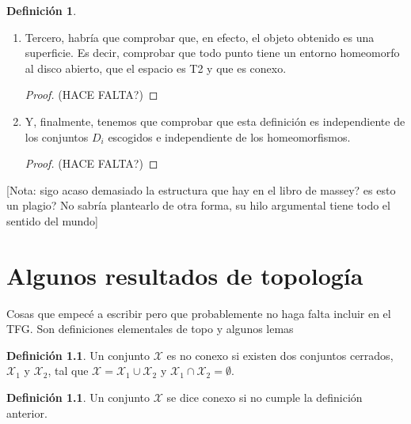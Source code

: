 \documentclass[a4paper,11pt,spanish, twoside, leqno]{tfg-uam}
\theoremstyle{definition}
\newtheorem{defin}[teor]{Definici\'on}
\begin{document}
\begin{defin}
\begin{enumerate}
\begin{proof}
			Partiendo de eso, basta con probar que dado un homeomorfismo $f: X\longrightarrow Y$, y el conjunto cerrado $B\subset X$, entonces $f(fr(B)))= fr(f(B))$.
			Para esto basta con probar que dado un homeomorfismo $f: U\subset X \longrightarrow V\subset Y$, con $U$ y $V$ cerrados, se cumple que $f(fr(U)) = fr(V)$. Esto se sigue directamente de que $f(\mathring{B})=\mathring{f(B)}$, que a su vez es resultado inmediato de las propiedades de homeomorfismos. (HACE FALTA?)
		\end{proof}
		\item 
		Tercero, habría que comprobar que, en efecto, el objeto obtenido es una superficie. Es decir, comprobar que todo punto tiene un entorno homeomorfo al disco abierto, que el espacio es T2 y que es conexo.
		\begin{proof}
			
			(HACE FALTA?)
		\end{proof}
		\item 
		Y, finalmente, tenemos que comprobar que esta definición es independiente de los conjuntos $D_i$ escogidos e independiente de los homeomorfismos.
		\begin{proof}
			(HACE FALTA?)
		\end{proof}
	\end{enumerate} 
\end{defin}

[Nota: sigo acaso demasiado la estructura que hay en el libro de massey? es esto un plagio? No sabría plantearlo de otra forma, su hilo argumental tiene todo el sentido del mundo]




\chapter{Algunos resultados de topología}
Cosas que empecé a escribir pero que probablemente no haga falta incluir en el TFG. Son definiciones elementales de topo y algunos lemas

\begin{defin}
	Un conjunto $\mathcal{X}$ es no conexo si existen dos  conjuntos cerrados, $\mathcal{X}_1$ y $\mathcal{X}_2$, tal que $\mathcal{X}=\mathcal{X}_1\cup\mathcal{X}_2$ y $\mathcal{X}_1\cap\mathcal{X}_2=\emptyset$.
\end{defin}
\begin{defin}
	Un conjunto $\mathcal{X}$ se dice conexo si no cumple la definición anterior.
\end{defin}
\end{document}
